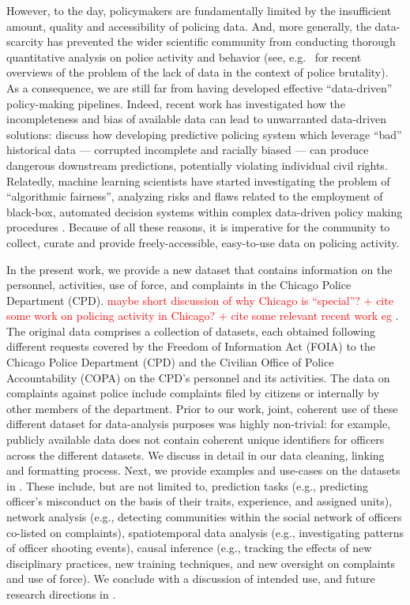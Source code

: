 However, to the day,  policymakers are fundamentally limited by the insufficient amount, quality and accessibility of policing data. And, more generally, the data-scarcity has prevented the wider scientific community from conducting thorough quantitative analysis on police activity and behavior (see, e.g.\ \citet{peeples2019data,peeples2020data} for recent overviews of the problem of the lack of data in the context of police brutality). As a consequence, we are still far from having developed effective ``data-driven'' policy-making pipelines. Indeed, recent work has investigated how the incompleteness and bias of available data can lead to unwarranted data-driven solutions: \citet{richardson2019dirty} discuss how developing predictive policing system which leverage ``bad'' historical data --- corrupted incomplete and racially biased --- can produce dangerous downstream predictions, potentially violating individual civil rights. Relatedly, machine learning scientists have started investigating the problem of ``algorithmic fairness'', analyzing  risks and flaws related to the employment of black-box, automated decision systems within complex data-driven policy making procedures \citep{veale2018fairness, sloane2019ai, d2020fairness}. Because of all these reasons, it is imperative for the community to collect, curate and provide freely-accessible, easy-to-use data on policing activity.


In the present work, we provide a new dataset that contains information on the personnel, activities, use of force, and complaints in the Chicago Police Department (CPD). \textcolor{red}{maybe short discussion of why Chicago is ``special''? + cite some work on policing activity in Chicago? + cite some relevant recent work eg \citep{ba2021role}}. The original data comprises a collection of datasets, each obtained following different requests covered by the Freedom of Information Act (FOIA) to the Chicago Police Department (CPD) and the Civilian Office of Police Accountability (COPA) on the CPD's personnel and its activities. The data on complaints against police include complaints filed by citizens or internally by other members of the department.  Prior to our work, joint, coherent use of these different dataset for data-analysis purposes was highly non-trivial: for example, publicly available data does not contain coherent unique identifiers for officers across the different datasets. We discuss in detail in  our data cleaning, linking and formatting process. Next, we provide examples and use-cases on the datasets in . These include, but are not limited to, prediction tasks (e.g., predicting officer's misconduct on the basis of their traits, experience, and assigned units), network analysis (e.g., detecting communities within the social network of officers co-listed on complaints), spatiotemporal data analysis (e.g., investigating patterns of officer shooting events), causal inference (e.g., tracking the effects of new disciplinary practices, new training techniques, and new oversight on complaints and use of force). We conclude with a discussion of intended use, and future research directions in .


